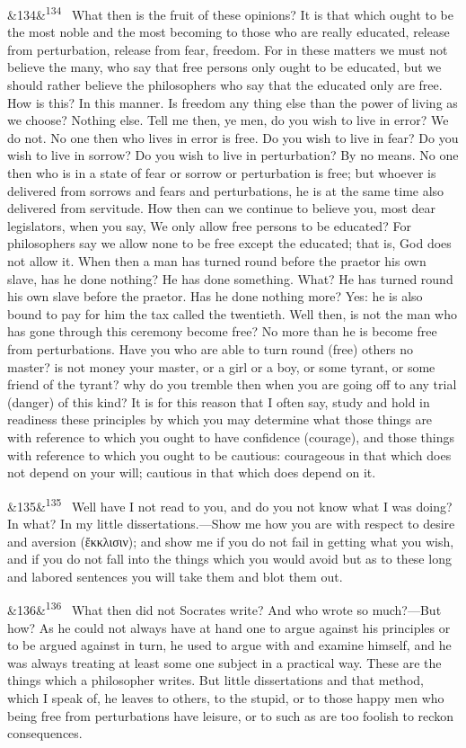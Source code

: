 \documentclass[12pt]{article}
\newcommand{\para}[1][]{\par\noindent\ifx&#1&\else\textsuperscript{\footnotesize #1}~\fi}
\begin{document}
\para[134] What then is the fruit of these opinions? It is that which ought to be the most noble and the most becoming to those who are really educated, release from perturbation, release from fear, freedom. For in these matters we must not believe the many, who say that free persons only ought to be educated, but we should rather believe the philosophers who say that the educated only are free. How is this? In this manner. Is freedom any thing else than the power of living as we choose? Nothing else. Tell me then, ye men, do you wish to live in error? We do not. No one then who lives in error is free. Do you wish to live in fear? Do you wish to live in sorrow? Do you wish to live in perturbation? By no means. No one then who is in a state of fear or sorrow or perturbation is free; but whoever is delivered from sorrows and fears and perturbations, he is at the same time also delivered from servitude. How then can we continue to believe you, most dear legislators, when you say, We only allow free persons to be educated? For philosophers say we allow none to be free except the educated; that is, God does not allow it. When then a man has turned round before the praetor his own slave, has he done nothing? He has done something. What? He has turned round his own slave before the praetor. Has he done nothing more? Yes: he is also bound to pay for him the tax called the twentieth. Well then, is not the man who has gone through this ceremony become free? No more than he is become free from perturbations. Have you who are able to turn round (free) others no master? is not money your master, or a girl or a boy, or some tyrant, or some friend of the tyrant? why do you tremble then when you are going off to any trial (danger) of this kind? It is for this reason that I often say, study and hold in readiness these principles by which you may determine what those things are with reference to which you ought to have confidence (courage), and those things with reference to which you ought to be cautious: courageous in that which does not depend on your will; cautious in that which does depend on it.

\para[135] Well have I not read to you, and do you not know what I was doing? In what? In my little dissertations.—Show me how you are with respect to desire and aversion (ἔκκλισιν); and show me if you do not fail in getting what you wish, and if you do not fall into the things which you would avoid but as to these long and labored sentences you will take them and blot them out.

\para[136] What then did not Socrates write? And who wrote so much?—But how? As he could not always have at hand one to argue against his principles or to be argued against in turn, he used to argue with and examine himself, and he was always treating at least some one subject in a practical way. These are the things which a philosopher writes. But little dissertations and that method, which I speak of, he leaves to others, to the stupid, or to those happy men who being free from perturbations have leisure, or to such as are too foolish to reckon consequences.
\end{document}
